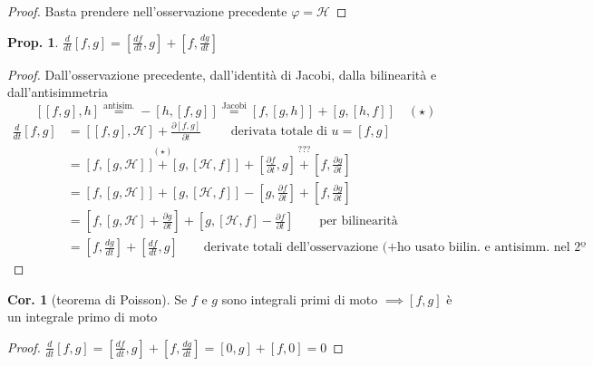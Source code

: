 \documentclass[a4paper,10pt]{article}
\theoremstyle{definition}
\theoremstyle{indentdefinition}
\theoremstyle{indenttheorem}
\newtheorem{prop}{Prop.}
\newtheorem{cor}{Cor.}
\theoremstyle{myremark}
\theoremstyle{indentgeneral}
\newenvironment{myboxed} 
{\noindent\begin{lrbox}{\mybox}\begin{minipage}{\textwidth}}
{\end{minipage}\end{lrbox}\fbox{\usebox{\mybox}}}
\begin{document}
\begin{proof}
    Basta prendere nell'osservazione precedente $\varphi=\mathcal{H}$
\end{proof}

\begin{prop}
$\frac{d}{dt}\left[f,g\right]=\left[\frac{df}{dt},g\right]+\left[f,\frac{dg}{dt}\right]$
\end{prop}

\begin{proof}
Dall'osservazione precedente, dall'identità di Jacobi, dalla bilinearità
e dall'antisimmetria
$$[[f,g],h]\overset{\text{antisim.}}{=}-[h,[f,g]]\overset{\text{Jacobi}}{=}[f,[g,h]]+[g,[h,f]]\quad (\star)$$
\begin{align*}
\frac{d}{dt}\left[f,g\right] &=\left[\left[f,g\right],\mathcal{H}\right]+\frac{\partial\left[f,g\right]}{\partial t} \qquad\text{ derivata totale di $u=[f,g]$}\\
&=\overset{(\star)}{\boxed{\left[f,\left[g,\mathcal{H}\right]\right]+\left[g,\left[\mathcal{H},f\right]\right]}}+\overset{???}{\boxed{\left[\frac{\partial f}{\partial t},g\right]+\left[f,\frac{\partial g}{\partial t}\right]}}\\
&={\left[f,\left[g,\mathcal{H}\right]\right]+\left[g,\left[\mathcal{H},f\right]\right]}-{\left[g,\frac{\partial f}{\partial t}\right]+\left[f,\frac{\partial g}{\partial t}\right]}\\
 &=\left[f,\left[g,\mathcal{H}\right]+\frac{\partial g}{\partial t}\right]+\left[g,\left[\mathcal{H},f\right]-\frac{\partial f}{\partial t}\right]  \qquad\text{per bilinearità}\\
 &=\left[f,\frac{dg}{dt}\right]+\left[\frac{df}{dt},g\right]  \qquad\text{derivate totali dell'osservazione (+ho usato biilin. e antisimm. nel 2º membro)}
\end{align*}
\end{proof}

\begin{myboxed}
\begin{cor}[teorema di Poisson]
Se $f$ e $g$ sono integrali primi di moto $\implies\left[f,g\right]$
è un integrale primo di moto
\end{cor}
\end{myboxed}

\begin{proof}
$\frac{d}{dt}\left[f,g\right]=\left[\frac{df}{dt},g\right]+\left[f,\frac{dg}{dt}\right]=\left[0,g\right]+\left[f,0\right]=0$
\end{proof}
\end{document}
